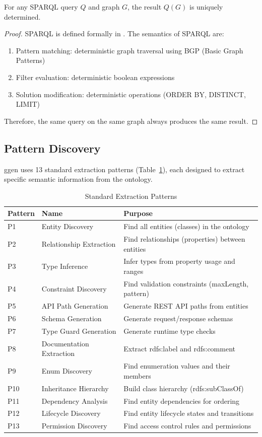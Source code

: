 \begin{theorem}
    For any SPARQL query \(Q\) and graph \(G\), the result \(Q(G)\) is uniquely determined.
\end{theorem}

\begin{proof}
    SPARQL is defined formally in \cite{sparql2013}. The semantics of SPARQL are:
    \begin{enumerate}
        \item Pattern matching: deterministic graph traversal using BGP (Basic Graph Patterns)
        \item Filter evaluation: deterministic boolean expressions
        \item Solution modification: deterministic operations (ORDER BY, DISTINCT, LIMIT)
    \end{enumerate}
    Therefore, the same query on the same graph always produces the same result.
\end{proof}

\subsection{Pattern Discovery}

ggen uses 13 standard extraction patterns (Table~\ref{tab:patterns}), each designed to extract specific semantic information from the ontology.

\begin{table}[h]
\centering
\caption{Standard Extraction Patterns}
\label{tab:patterns}
\begin{tabular}{llp{6cm}}
\toprule
\textbf{Pattern} & \textbf{Name} & \textbf{Purpose} \\
\midrule
P1 & Entity Discovery & Find all entities (classes) in the ontology \\
P2 & Relationship Extraction & Find relationships (properties) between entities \\
P3 & Type Inference & Infer types from property usage and ranges \\
P4 & Constraint Discovery & Find validation constraints (maxLength, pattern) \\
P5 & API Path Generation & Generate REST API paths from entities \\
P6 & Schema Generation & Generate request/response schemas \\
P7 & Type Guard Generation & Generate runtime type checks \\
P8 & Documentation Extraction & Extract rdfs:label and rdfs:comment \\
P9 & Enum Discovery & Find enumeration values and their members \\
P10 & Inheritance Hierarchy & Build class hierarchy (rdfs:subClassOf) \\
P11 & Dependency Analysis & Find entity dependencies for ordering \\
P12 & Lifecycle Discovery & Find entity lifecycle states and transitions \\
P13 & Permission Discovery & Find access control rules and permissions \\
\bottomrule
\end{tabular}
\end{table}

